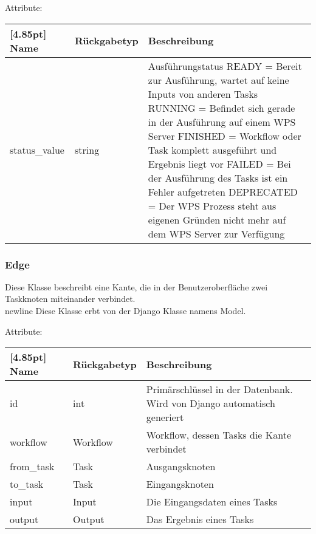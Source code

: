 			Attribute:
			\begin{center}
				\setlength\tabcolsep{5pt}
				\renewcommand{\arraystretch}{1.5}
				
				\begin{tabularx}{\textwidth}{|l|l|X|}
					\hline
					\rowcolor[gray]{0.75}[4.85pt]
					Name & Rückgabetyp & Beschreibung \\ \hline 
	           		status\_value & string & Ausführungstatus\newline
	           		READY = Bereit zur Ausführung, wartet auf keine Inputs von anderen Tasks \newline
	           		RUNNING = Befindet sich gerade in der Ausführung auf einem WPS Server \newline 
	           		FINISHED = Workflow oder Task komplett ausgeführt und Ergebnis liegt vor \newline
	           		FAILED = Bei der Ausführung des Tasks ist ein Fehler aufgetreten \newline
	           		DEPRECATED = Der WPS Prozess steht aus eigenen Gründen nicht mehr auf dem WPS Server zur Verfügung \\
	           		\hline
				\end{tabularx}
			\end{center}
        \subsubsection{Edge}	
    			Diese Klasse beschreibt eine Kante, die in der Benutzeroberfläche zwei Taskknoten miteinander verbindet. \\newline
    			Diese Klasse erbt von der Django Klasse namens \glqq Model\grqq .
    			
    			Attribute:
    			\begin{center}
    				\setlength\tabcolsep{5pt}
    				\renewcommand{\arraystretch}{1.5}
    				
    				\begin{tabularx}{\textwidth}{|l|l|X|}
    					\hline
    					\rowcolor[gray]{0.75}[4.85pt]
    					Name & Rückgabetyp & Beschreibung \\ \hline 
    	           		id & int & Primärschlüssel in der Datenbank. Wird von Django automatisch generiert \\ \hline
    	           		workflow & Workflow & Workflow, dessen Tasks die Kante verbindet \\ \hline
    	           		from\_task & Task & Ausgangsknoten \\ \hline
    	           	    to\_task & Task & Eingangsknoten \\ \hline
    	           		input & Input & Die Eingangsdaten eines Tasks\\ \hline
    	           		output & Output & Das Ergebnis eines Tasks \\
    	           		
    	           		\hline
    				\end{tabularx}
    			\end{center}
